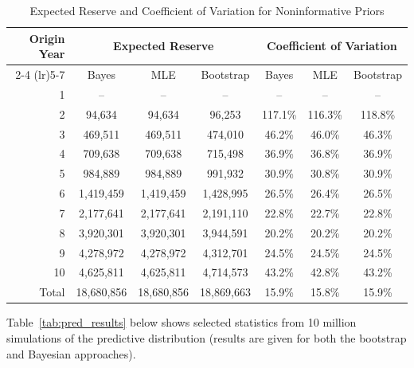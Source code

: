 \documentclass[aps,pre,draft]{revtex4-2}
\begin{document}
\begin{table}[htbp]
\centering
\caption{Expected Reserve and Coefficient of Variation for Noninformative Priors}
\label{tab:noninfresults}
\begin{tabular}{rcccccc}
\toprule
\multirow{2}{*}{Origin Year} & \multicolumn{3}{c}{Expected Reserve} & \multicolumn{3}{c}{Coefficient of Variation} \\
\cmidrule(lr){2-4} \cmidrule(lr){5-7}
 & Bayes & MLE & Bootstrap & Bayes & MLE & Bootstrap \\
\midrule
1  & --       & --       & --       & --      & --      & --      \\
2  & 94,634   & 94,634   & 96,253   & 117.1\% & 116.3\% & 118.8\% \\
3  & 469,511  & 469,511  & 474,010  & 46.2\%  & 46.0\%  & 46.3\%  \\
4  & 709,638  & 709,638  & 715,498  & 36.9\%  & 36.8\%  & 36.9\%  \\
5  & 984,889  & 984,889  & 991,932  & 30.9\%  & 30.8\%  & 30.9\%  \\
6  & 1,419,459& 1,419,459& 1,428,995& 26.5\%  & 26.4\%  & 26.5\%  \\
7  & 2,177,641& 2,177,641& 2,191,110& 22.8\%  & 22.7\%  & 22.8\%  \\
8  & 3,920,301& 3,920,301& 3,944,591& 20.2\%  & 20.2\%  & 20.2\%  \\
9  & 4,278,972& 4,278,972& 4,312,701& 24.5\%  & 24.5\%  & 24.5\%  \\
10 & 4,625,811& 4,625,811& 4,714,573& 43.2\%  & 42.8\%  & 43.2\%  \\
\midrule
Total & 18,680,856 & 18,680,856 & 18,869,663 & 15.9\% & 15.8\% & 15.9\% \\
\bottomrule
\end{tabular}%
\end{table}

Table~\ref{tab:pred_results} below shows selected statistics from 10 million simulations of the predictive distribution (results are given for both the bootstrap and Bayesian approaches).
\end{document}
